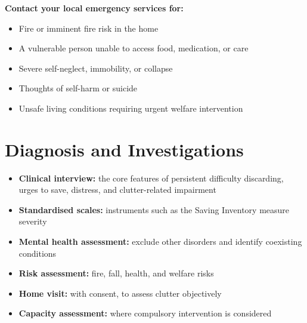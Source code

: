 \textbf{Contact your local emergency services for:}
\begin{itemize}
    \item Fire or imminent fire risk in the home
    \item A vulnerable person unable to access food, medication, or care
    \item Severe self-neglect, immobility, or collapse
    \item Thoughts of self-harm or suicide
    \item Unsafe living conditions requiring urgent welfare intervention
\end{itemize}

\section*{Diagnosis and Investigations}
\begin{itemize}
    \item \textbf{Clinical interview:} the core features of persistent difficulty discarding, urges to save, distress, and clutter-related impairment
    \item \textbf{Standardised scales:} instruments such as the Saving Inventory measure severity
    \item \textbf{Mental health assessment:} exclude other disorders and identify coexisting conditions
    \item \textbf{Risk assessment:} fire, fall, health, and welfare risks
    \item \textbf{Home visit:} with consent, to assess clutter objectively
    \item \textbf{Capacity assessment:} where compulsory intervention is considered
\end{itemize}

